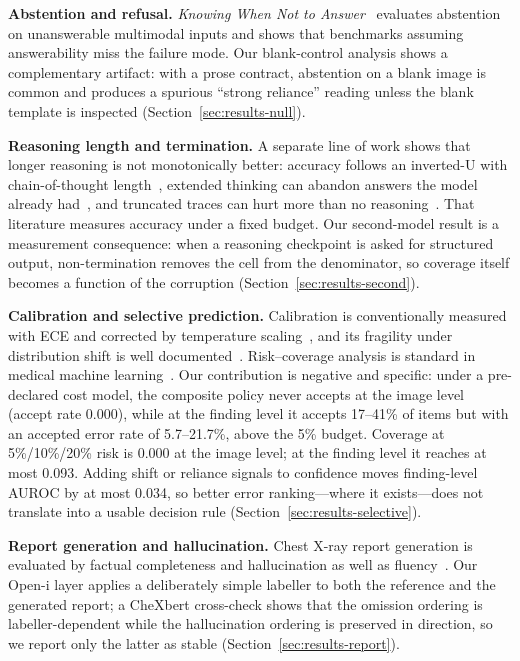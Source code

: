 \textbf{Abstention and refusal.} \emph{Knowing When Not to Answer}~\citep{madhusudhan2026knowing} evaluates abstention on unanswerable multimodal inputs and shows that benchmarks assuming answerability miss the failure mode. Our blank-control analysis shows a complementary artifact: with a prose contract, abstention on a blank image is common and produces a spurious ``strong reliance'' reading unless the blank template is inspected (Section~\ref{sec:results-null}).

\textbf{Reasoning length and termination.} A separate line of work shows that longer reasoning is not monotonically better: accuracy follows an inverted-U with chain-of-thought length~\citep{wu2026whenmore}, extended thinking can abandon answers the model already had~\citep{zhou2026overthinking}, and truncated traces can hurt more than no reasoning~\citep{su2026broken}. That literature measures accuracy under a fixed budget. Our second-model result is a measurement consequence: when a reasoning checkpoint is asked for structured output, non-termination removes the cell from the denominator, so coverage itself becomes a function of the corruption (Section~\ref{sec:results-second}).

\textbf{Calibration and selective prediction.} Calibration is conventionally measured with ECE and corrected by temperature scaling~\citep{guo2017calibration}, and its fragility under distribution shift is well documented~\citep{ovadia2019trust}. Risk--coverage analysis is standard in medical machine learning~\citep{geifman2017selective,kompa2021second}. Our contribution is negative and specific: under a pre-declared cost model, the composite policy never accepts at the image level (accept rate 0.000), while at the finding level it accepts 17--41\% of items but with an accepted error rate of 5.7--21.7\%, above the 5\% budget. Coverage at 5\%/10\%/20\% risk is 0.000 at the image level; at the finding level it reaches at most 0.093. Adding shift or reliance signals to confidence moves finding-level AUROC by at most 0.034, so better error ranking---where it exists---does not translate into a usable decision rule (Section~\ref{sec:results-selective}).

\textbf{Report generation and hallucination.} Chest X-ray report generation is evaluated by factual completeness and hallucination as well as fluency~\citep{heiman2025factchexcker}. Our Open-i layer applies a deliberately simple labeller to both the reference and the generated report; a CheXbert cross-check shows that the omission ordering is labeller-dependent while the hallucination ordering is preserved in direction, so we report only the latter as stable (Section~\ref{sec:results-report}).

